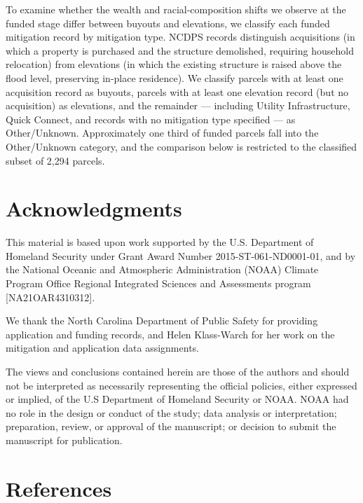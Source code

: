 \documentclass[
  authoryear,
  preprint]{elsarticle}
\begin{document}
To examine whether the wealth and racial-composition shifts we observe
at the funded stage differ between buyouts and elevations, we classify
each funded mitigation record by mitigation type. NCDPS records
distinguish acquisitions (in which a property is purchased and the
structure demolished, requiring household relocation) from elevations
(in which the existing structure is raised above the flood level,
preserving in-place residence). We classify parcels with at least one
acquisition record as buyouts, parcels with at least one elevation
record (but no acquisition) as elevations, and the remainder ---
including Utility Infrastructure, Quick Connect, and records with no
mitigation type specified --- as Other/Unknown. Approximately one third
of funded parcels fall into the Other/Unknown category, and the
comparison below is restricted to the classified subset of 2,294
parcels.

\section*{Acknowledgments}\label{acknowledgments}

This material is based upon work supported by the U.S. Department of
Homeland Security under Grant Award Number 2015-ST-061-ND0001-01, and by
the National Oceanic and Atmospheric Administration (NOAA) Climate
Program Office Regional Integrated Sciences and Assessments program
{[}NA21OAR4310312{]}.

We thank the North Carolina Department of Public Safety for providing
application and funding records, and Helen Klass-Warch for her work on
the mitigation and application data assignments.

The views and conclusions contained herein are those of the authors and
should not be interpreted as necessarily representing the official
policies, either expressed or implied, of the U.S Department of Homeland
Security or NOAA. NOAA had no role in the design or conduct of the
study; data analysis or interpretation; preparation, review, or approval
of the manuscript; or decision to submit the manuscript for publication.

\section*{References}\label{references}

\renewcommand{\bibsection}{}

\end{document}
